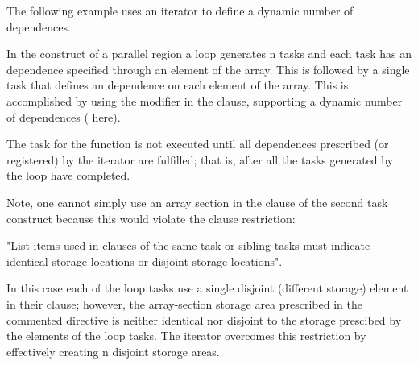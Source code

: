 The following example uses an iterator to define a dynamic number of
dependences.

In the  construct of a parallel region a loop generates n tasks
and each task has an  dependence specified through an element of
the  array.  This is followed by a single task that defines an 
dependence on each element of the array.  This is accomplished by
using the  modifier in the  clause, supporting a dynamic number
of dependences ( here).

The task for the  function is not executed until all dependences
prescribed (or registered) by the iterator are fulfilled; that is,
after all the tasks generated by the loop have completed.

Note, one cannot simply use an array section in the  clause
of the second task construct because this would violate the  clause restriction:

"List items used in  clauses of the same task or sibling tasks
must indicate identical storage locations or disjoint storage locations".

In this case each of the loop tasks use a single disjoint (different storage)
element in their  clause; however,
the array-section storage area prescribed in the commented directive is neither
identical nor disjoint to the storage prescibed by the elements of the
loop tasks.  The iterator overcomes this restriction by effectively
creating n disjoint storage areas.


